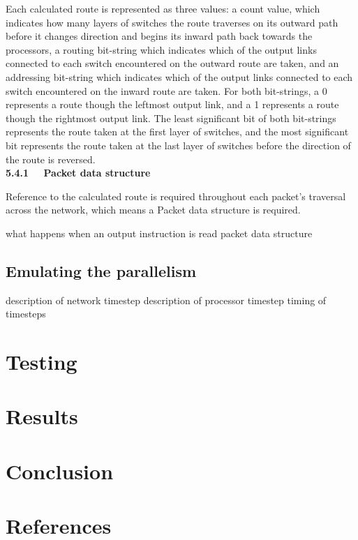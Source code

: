 \documentclass[a4paper, 12pt]{article}
\begin{document}
Each calculated route is represented as three values: a count value, which indicates how many layers of switches the route traverses on its outward path before it changes direction and begins its inward path back towards the processors, a routing bit-string which indicates which of the output links connected to each switch encountered on the outward route are taken, and an addressing bit-string which indicates which of the output links connected to each switch encountered on the inward route are taken. For both bit-strings, a 0 represents a route though the leftmost output link, and a 1 represents a route though the rightmost output link. The least significant bit of both bit-strings represents the route taken at the first layer of switches, and the most significant bit represents the route taken at the last layer of switches before the direction of the route is reversed.\\

\noindent\textbf{5.4.1 \ \ Packet data structure}

\noindent Reference to the calculated route is required throughout each packet's traversal across the network, which means a Packet data structure is required.

what happens when an output instruction is read
packet data structure

\subsection{Emulating the parallelism}
\label{sec:imp_parallelism}

description of network timestep
description of processor timestep
timing of timesteps

\newpage
\section{Testing}



\newpage
\section{Results}



\newpage
\section{Conclusion}



\newpage
\section{References}
\end{document}
